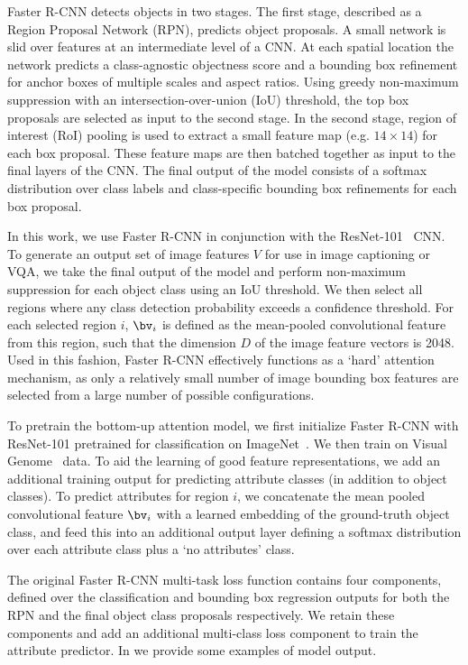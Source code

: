 \documentclass[10pt,twocolumn,letterpaper]{article}
\begin{document}
Faster R-CNN detects objects in two stages. The first stage, described as a Region Proposal Network (RPN), predicts object proposals. A small network is slid over features at an intermediate level of a CNN. At each spatial location the network predicts a class-agnostic objectness score and a bounding box refinement for anchor boxes of multiple scales and aspect ratios. Using greedy non-maximum suppression with an intersection-over-union (IoU) threshold, the top box proposals are selected as input to the second stage. In the second stage, region of interest (RoI) pooling is used to extract a small feature map (e.g. $14\times14$) for each box proposal. These feature maps are then batched together as input to the final layers of the CNN. The final output of the model consists of a softmax distribution over class labels and class-specific bounding box refinements for each box proposal. 

In this work, we use Faster R-CNN in conjunction with the ResNet-101~\cite{he2015deep} CNN. To generate an output set of image features $V$ for use in image captioning or VQA, we take the final output of the model and perform non-maximum suppression for each object class using an IoU threshold. We then select all regions where any class detection probability exceeds a confidence threshold. 
For each selected region $i$, $\bv_i$ is defined as the mean-pooled convolutional feature from this region, such that the dimension $D$ of the image feature vectors is 2048. Used in this fashion, Faster R-CNN effectively functions as a `hard' attention mechanism, as only a relatively small number of image bounding box features are selected from a large number of possible configurations. 

To pretrain the bottom-up attention model, we first initialize Faster R-CNN with ResNet-101 pretrained for classification on ImageNet~\cite{ILSVRC15}. We then train on Visual Genome~\cite{krishnavisualgenome} data. To aid the learning of good feature representations, we add an additional training output for predicting attribute classes (in addition to object classes). To predict attributes for region $i$, we concatenate the mean pooled convolutional feature $\bv_i$ with a learned embedding of the ground-truth object class, and feed this into an additional output layer defining a softmax distribution over each attribute class plus a `no attributes' class.

The original Faster R-CNN multi-task loss function contains four components, defined over the classification and bounding box regression outputs for both the RPN and the final object class proposals respectively. We retain these components and add an additional multi-class loss component to train the attribute predictor. In  we provide some examples of model output. 
\end{document}
